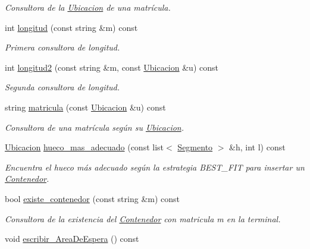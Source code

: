 \begin{DoxyCompactItemize}
\begin{DoxyCompactList}\small\item\em Consultora de la \hyperlink{class_ubicacion}{Ubicacion} de una matrícula. \end{DoxyCompactList}\item 
int \hyperlink{class_terminal_afc6d0f22bcc642c6ac4355e0b02a7d79}{longitud} (const string \&m) const
\begin{DoxyCompactList}\small\item\em Primera consultora de longitud. \end{DoxyCompactList}\item 
int \hyperlink{class_terminal_a46db625d1ad0b3b0ddb69657d0711085}{longitud2} (const string \&m, const \hyperlink{class_ubicacion}{Ubicacion} \&u) const
\begin{DoxyCompactList}\small\item\em Segunda consultora de longitud. \end{DoxyCompactList}\item 
string \hyperlink{class_terminal_a674811a7b56f57ff5b447d10565e923b}{matricula} (const \hyperlink{class_ubicacion}{Ubicacion} \&u) const
\begin{DoxyCompactList}\small\item\em Consultora de una matrícula según su \hyperlink{class_ubicacion}{Ubicacion}. \end{DoxyCompactList}\item 
\hyperlink{class_ubicacion}{Ubicacion} \hyperlink{class_terminal_ab14183e499defc434f593c5767605834}{hueco\+\_\+mas\+\_\+adecuado} (const list$<$ \hyperlink{class_segmento}{Segmento} $>$ \&h, int l) const
\begin{DoxyCompactList}\small\item\em Encuentra el hueco más adecuado según la estrategia B\+E\+S\+T\+\_\+\+F\+IT para insertar un \hyperlink{class_contenedor}{Contenedor}. \end{DoxyCompactList}\item 
bool \hyperlink{class_terminal_a6b2cb1486f78ef82f759fb071bb1049d}{existe\+\_\+contenedor} (const string \&m) const
\begin{DoxyCompactList}\small\item\em Consultora de la existencia del \hyperlink{class_contenedor}{Contenedor} con matricula {\itshape m} en la terminal. \end{DoxyCompactList}\item 
void \hyperlink{class_terminal_a3da2635443b21d89e5fecc47153a888f}{escribir\+\_\+\+Area\+De\+Espera} () const

\end{DoxyCompactItemize}
